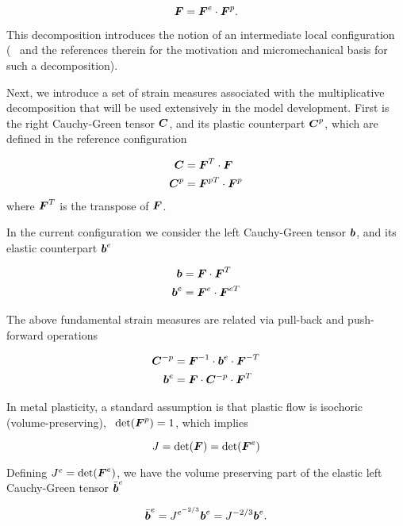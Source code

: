 \documentclass[11pt]{article}
\theoremstyle{remark}
\begin{document}
\begin{equation}
  {\boldsymbol{F}} = {\boldsymbol{F}}^e \cdot {\boldsymbol{F}}^p.
\end{equation}

This decomposition introduces the notion of an intermediate local
configuration (\cf\ \cite{SimoHughes:98} and the references therein
for the motivation and micromechanical basis for such a
decomposition).

Next, we introduce a set of strain measures associated with the
multiplicative decomposition that will be used extensively in the
model development. First is the right Cauchy-Green tensor ${\boldsymbol{C}}$, and
its plastic counterpart ${\boldsymbol{C}}^p$, which are defined in the reference
configuration

\begin{align}
  {\boldsymbol{C}} &= {\boldsymbol{F}}^T \cdot {\boldsymbol{F}}\\ {\boldsymbol{C}}^p &= {\boldsymbol{F}}^{pT} \cdot {\boldsymbol{F}}^p
\end{align}
where ${\boldsymbol{F}}^T$ is the transpose of ${\boldsymbol{F}}$.

In the current configuration we consider the left Cauchy-Green tensor
${\boldsymbol{b}}$, and its elastic counterpart ${{\boldsymbol{b}}}^e$

\begin{align}
  {\boldsymbol{b}} &= {\boldsymbol{F}} \cdot {\boldsymbol{F}}^{T}\\ {\boldsymbol{b}}^e &= {\boldsymbol{F}}^e \cdot
  {\boldsymbol{F}}^{eT}\label{eq:be}
\end{align}

The above fundamental strain measures are related via pull-back and
push-forward operations

\begin{align}\label{eq:pullpush}
  {\boldsymbol{C}}^{-p} &={\boldsymbol{F}}^{-1} \cdot {\boldsymbol{b}}^e \cdot {\boldsymbol{F}}^{-T}\\ {\boldsymbol{b}}^e &= {\boldsymbol{F}} \cdot
  {\boldsymbol{C}}^{-p} \cdot {\boldsymbol{F}}^T
\end{align}

In metal plasticity, a standard assumption is that plastic flow is
isochoric (volume-preserving), \ie\ $\det({\boldsymbol{F}}^p)=1$, which implies

\begin{equation}
  J = \det ({\boldsymbol{F}}) = \det ({\boldsymbol{F}}^e)
\end{equation}

Defining $J^e=\det({\boldsymbol{F}}^e)$, we have the volume preserving part of the
elastic left Cauchy-Green tensor $\bar{{\boldsymbol{b}}}^e$

\begin{equation}
  \bar{{\boldsymbol{b}}}^e = J^{e^{-2/3}}{\boldsymbol{b}}^e = J^{-2/3}{\boldsymbol{b}}^e.
\end{equation}
\end{document}
